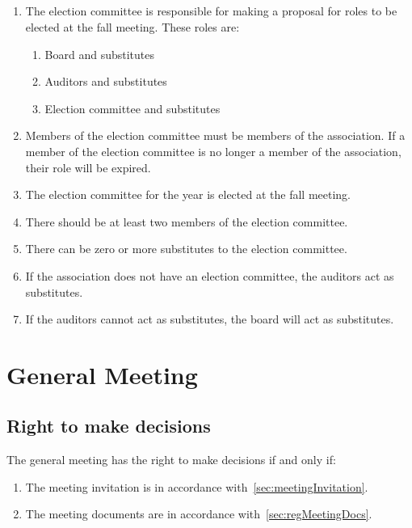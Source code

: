 \subsection{}
\begin{enumerate}
  \item The election committee is responsible for making a proposal for roles to be elected at the fall meeting. These roles are:
  \begin{enumerate}
    \item Board and substitutes
    \item Auditors and substitutes
    \item Election committee and substitutes
  \end{enumerate}
  \item Members of the election committee must be members of the association. If a member of the election committee is no longer a member of the association, their role will be expired.
  \item The election committee for the year is elected at the fall meeting.
  \item There should be at least two members of the election committee. 
  \item There can be zero or more substitutes to the election committee.
  \item If the association does not have an election committee, the auditors act as substitutes.
  \item If the auditors cannot act as substitutes, the board will act as substitutes.
\end{enumerate}

\section*{General Meeting}

\subsection{Right to make decisions}
The general meeting has the right to make decisions if and only if:
\begin{enumerate}
  \item The meeting invitation is in accordance with~\ref{sec:meetingInvitation}.
  \item The meeting documents are in accordance with~\ref{sec:regMeetingDocs}.
\end{enumerate}

